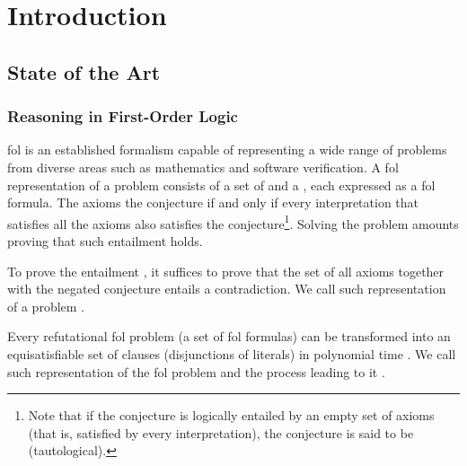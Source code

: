 
\chapter{Introduction}
\glsresetall


\section{State of the Art}
\label{sec:sota}

\subsection{Reasoning in First-Order Logic}

\Gls{fol} is an established formalism capable of representing a wide range of problems from diverse areas such as mathematics and software verification.
A \gls{fol} representation of a problem consists of a set of  and a ,
each expressed as a \gls{fol} formula.
The axioms  the conjecture if and only if
every interpretation that satisfies all the axioms also satisfies the conjecture\footnote{Note that if the conjecture is logically entailed by an empty set of axioms
(that is, satisfied by every interpretation),
the conjecture is said to be  (tautological).}.
Solving the problem amounts proving that such entailment holds.

To prove the entailment ,
it suffices to prove that the set of all axioms together with the negated conjecture entails a contradiction.
We call such representation of a problem .

Every refutational \gls{fol} problem (a set of \gls{fol} formulas) can be transformed into an equisatisfiable set of clauses (disjunctions of literals) in polynomial time \cite{}.
We call such representation of the \gls{fol} problem 
and the process leading to it .

